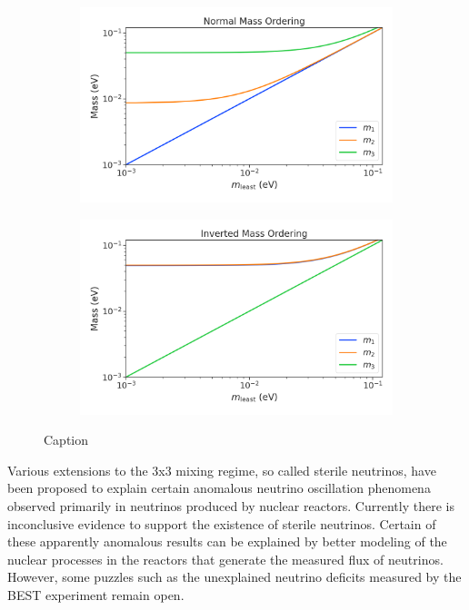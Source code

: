 \begin{figure}[htbp]
    \centering
    \begin{subfigure}{0.7\textwidth}
        \includegraphics*[width=\textwidth]{figs/Chapter-2/230302_mass_estate_vals_normal.png}
        \caption{}
    \end{subfigure}
    \hfill
    \begin{subfigure}{0.7\textwidth}
        \includegraphics*[width=\textwidth]{figs/Chapter-2/230302_mass_estate_vals_inverted.png}
        \caption{}
    \end{subfigure}
    \caption{Caption}
    \label{fig:chap2-mass-estates}
\end{figure}

Various extensions to the 3x3 mixing regime, so called sterile neutrinos, have been proposed to explain certain anomalous neutrino oscillation phenomena observed primarily in neutrinos produced by nuclear reactors. Currently there is inconclusive evidence to support the existence of sterile neutrinos. Certain of these apparently anomalous results can be explained by better modeling of the nuclear processes in the reactors that generate the measured flux of neutrinos. However, some puzzles such as the unexplained neutrino deficits measured by the BEST experiment remain open.  

